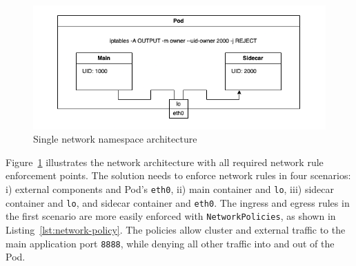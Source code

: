 \documentclass[english, 12pt, a4paper, sci, utf8, a-2b, online]{aaltothesis}
\begin{document}





\begin{figure}[h!]
  \centering
  \includegraphics[width=\linewidth]{files/iptables.png}
  \caption{Single network namespace architecture}
  \label{fig:single-net-solution}
\end{figure}

Figure~\ref{fig:single-net-solution} illustrates the network architecture with all required network rule enforcement points.
The solution needs to enforce network rules in four scenarios: i) external components and Pod's \texttt{eth0}, ii) main container and \texttt{lo}, iii) sidecar container and \texttt{lo}, and sidecar container and \texttt{eth0}.
The ingress and egress rules in the first scenario are more easily enforced with \texttt{NetworkPolicies}, as shown in Listing~\ref{lst:network-policy}.
The policies allow cluster and external traffic to the main application port \texttt{8888}, while denying all other traffic into and out of the Pod.
\end{document}
